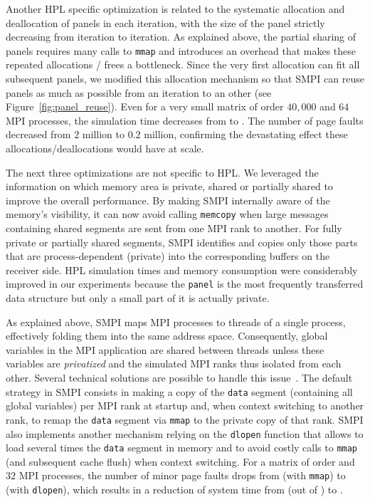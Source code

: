         Another HPL specific optimization is related to the systematic allocation and deallocation of panels in each
        iteration, with the size of the panel strictly decreasing from iteration to iteration. As explained above,
        the partial sharing of panels requires many calls to \texttt{mmap} and introduces an overhead that makes these
        repeated allocations / frees a bottleneck. Since the very first allocation can fit all subsequent panels, we
        modified this allocation mechanism so that SMPI can reuse panels as much as possible from an iteration to an
        other (see Figure~\ref{fig:panel_reuse}). Even for a very small matrix of order \(40,000\) and \(64\) MPI
        processes, the simulation time decreases from  to .  The number of page faults
        decreased from \(2\) million to \(0.2\) million, confirming the devastating effect these
        allocations/deallocations would have at scale.

        The next three optimizations are not specific to HPL.  We leveraged the information on which memory area is
        private, shared or partially shared to improve the overall performance.  By making SMPI internally aware of the
        memory's visibility, it can now avoid calling \texttt{memcopy} when large messages containing shared segments
        are sent from one MPI rank to another.  For fully private or partially shared segments, SMPI identifies and
        copies only those parts that are process-dependent (private) into the corresponding buffers on the receiver
        side.  HPL simulation times and memory consumption were considerably improved in our experiments because the
        \texttt{panel} is the most frequently transferred data structure but only a small part of it is actually
        private.

        As explained above, SMPI maps MPI processes to threads of a single process, effectively folding them into the
        same address space.  Consequently, global variables in the MPI application are shared between threads unless
        these variables are \emph{privatized} and the simulated MPI ranks thus isolated from each other. Several
        technical solutions are possible to handle this issue~\cite{smpi}. The default strategy in SMPI consists in
        making a copy of the \texttt{data} segment (containing all global variables) per MPI rank at startup and, when
        context switching to another rank, to remap the \texttt{data} segment via \texttt{mmap} to the private copy of
        that rank.  SMPI also implements another mechanism relying on the \texttt{dlopen} function that allows to load
        several times the \texttt{data} segment in memory and to avoid costly calls to \texttt{mmap} (and subsequent
        cache flush) when context switching. For a matrix of order  and \(32\) MPI processes, the number of
        minor page faults drops from  (with \texttt{mmap}) to  (with \texttt{dlopen}), which
        results in a reduction of system time from  (out of ) to .

